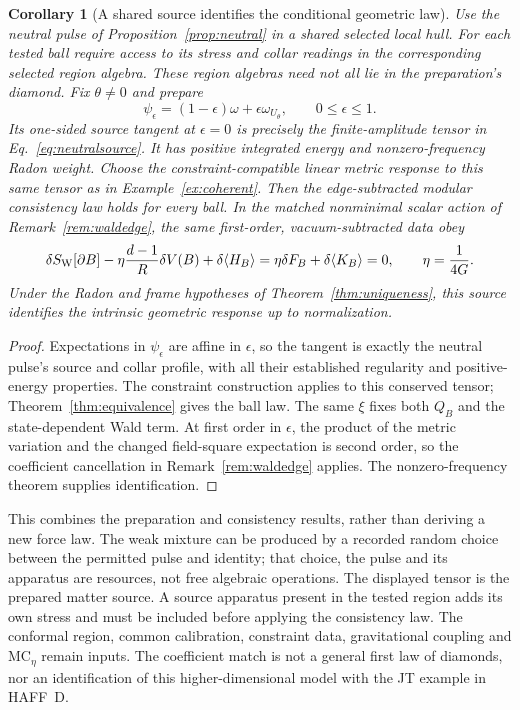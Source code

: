 \documentclass[12pt]{article}
\newtheorem{corollary}[theorem]{Corollary}
\theoremstyle{definition}
\theoremstyle{remark}
\begin{document}
\begin{corollary}[A shared source identifies the conditional geometric law]
\label{cor:common-source-test}
Use the neutral pulse of Proposition~\ref{prop:neutral} in a shared selected local hull. For each tested ball require access to its stress and collar readings in the corresponding selected region algebra. These region algebras need not all lie in the preparation's diamond. Fix $\theta\ne0$ and prepare
\[
 \psi_\epsilon=(1-\epsilon)\omega+\epsilon\omega_{U_\theta},
 \qquad 0\leq\epsilon\leq1.
\]
Its one-sided source tangent at $\epsilon=0$ is precisely the finite-amplitude tensor in Eq.~\eqref{eq:neutralsource}. It has positive integrated energy and nonzero-frequency Radon weight. Choose the constraint-compatible linear metric response to this same tensor as in Example~\ref{ex:coherent}. Then the edge-subtracted modular consistency law holds for every ball. In the matched nonminimal scalar action of Remark~\ref{rem:waldedge}, the same first-order, vacuum-subtracted data obey
\[
 \delta S_{\rm W}[\partial B]
 -\eta\frac{d-1}{R}\delta V(B)+\delta\langle H_B\rangle
 =\eta\delta F_B+\delta\langle K_B\rangle=0,
 \qquad \eta=\frac1{4G}.
\]
Under the Radon and frame hypotheses of Theorem~\ref{thm:uniqueness}, this source identifies the intrinsic geometric response up to normalization.
\end{corollary}
\begin{proof}
Expectations in $\psi_\epsilon$ are affine in $\epsilon$, so the tangent is exactly the neutral pulse's source and collar profile, with all their established regularity and positive-energy properties. The constraint construction applies to this conserved tensor; Theorem~\ref{thm:equivalence} gives the ball law. The same $\xi$ fixes both $Q_B$ and the state-dependent Wald term. At first order in $\epsilon$, the product of the metric variation and the changed field-square expectation is second order, so the coefficient cancellation in Remark~\ref{rem:waldedge} applies. The nonzero-frequency theorem supplies identification.
\end{proof}

This combines the preparation and consistency results, rather than deriving a new force law. The weak mixture can be produced by a recorded random choice between the permitted pulse and identity; that choice, the pulse and its apparatus are resources, not free algebraic operations. The displayed tensor is the prepared matter source. A source apparatus present in the tested region adds its own stress and must be included before applying the consistency law. The conformal region, common calibration, constraint data, gravitational coupling and $\mathrm{MC}_\eta$ remain inputs. The coefficient match is not a general first law of diamonds, nor an identification of this higher-dimensional model with the JT example in HAFF~D.
\end{document}
